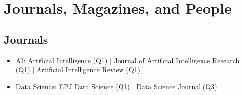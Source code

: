 \documentclass[12pt,oneside,a4paper]{article}
\begin{document}
\section{Journals, Magazines, and People}
\subsection{Journals}
\begin{itemize}
\item AI: Artificial Intelligence (Q1) | Journal of Artificial Intelligence Research (Q1) | Artificial Intelligence Review (Q1)
\item Data Science: EPJ Data Science (Q1) | Data Science Journal (Q3)
\end{itemize}
\end{document}
